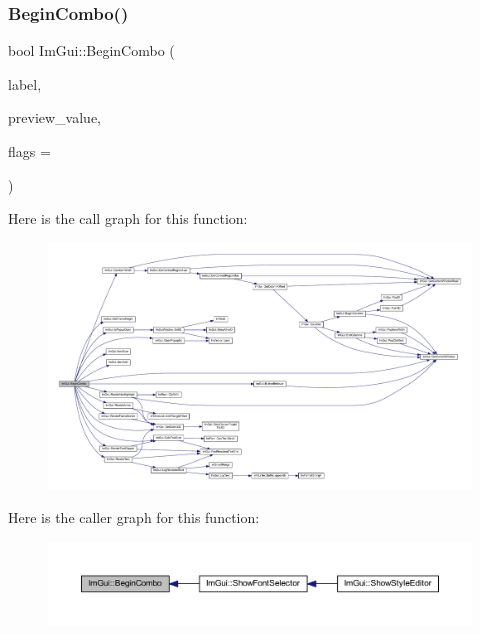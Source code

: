 \subsubsection{\texorpdfstring{Begin\+Combo()}{BeginCombo()}}
{\footnotesize\ttfamily bool Im\+Gui\+::\+Begin\+Combo (\begin{DoxyParamCaption}\item[{const char $\ast$}]{label,  }\item[{const char $\ast$}]{preview\+\_\+value,  }\item[{\mbox{\hyperlink{imgui_8h_aae31d1cfbcc55ae20b4122a7149d435e}{Im\+Gui\+Combo\+Flags}}}]{flags = {} }\end{DoxyParamCaption})}

Here is the call graph for this function\+:
\nopagebreak
\begin{figure}[H]
\begin{center}
\leavevmode
\includegraphics[width=350pt]{namespace_im_gui_aa895095bdc7a2907375c555e245575ea_cgraph}
\end{center}
\end{figure}
Here is the caller graph for this function\+:
\nopagebreak
\begin{figure}[H]
\begin{center}
\leavevmode
\includegraphics[width=350pt]{namespace_im_gui_aa895095bdc7a2907375c555e245575ea_icgraph}
\end{center}
\end{figure}
\mbox{\label{namespace_im_gui_ac2609b0f034d3bcd8d70d26df8694eaa}} 
